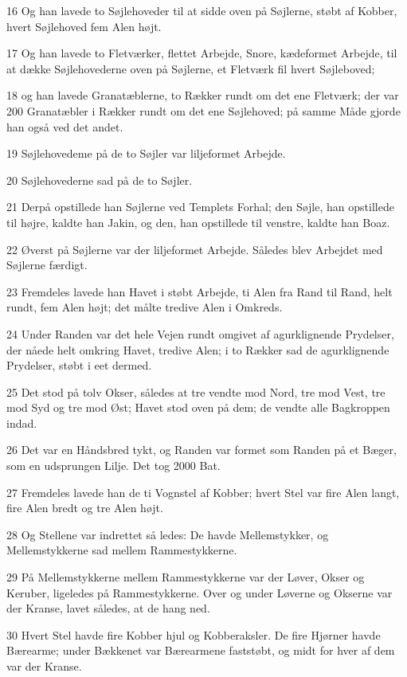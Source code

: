 \par 16 Og han lavede to Søjlehoveder til at sidde oven på Søjlerne, støbt af Kobber, hvert Søjlehoved fem Alen højt.
\par 17 Og han lavede to Fletværker, flettet Arbejde, Snore, kædeformet Arbejde, til at dække Søjlehovederne oven på Søjlerne, et Fletværk fil hvert Søjleboved;
\par 18 og han lavede Granatæblerne, to Rækker rundt om det ene Fletværk; der var 200 Granatæbler i Rækker rundt om det ene Søjlehoved; på samme Måde gjorde han også ved det andet.
\par 19 Søjlehovedeme på de to Søjler var liljeformet Arbejde.
\par 20 Søjlehovederne sad på de to Søjler.
\par 21 Derpå opstillede han Søjlerne ved Templets Forhal; den Søjle, han opstillede til højre, kaldte han Jakin, og den, han opstillede til venstre, kaldte han Boaz.
\par 22 Øverst på Søjlerne var der liljeformet Arbejde. Således blev Arbejdet med Søjlerne færdigt.
\par 23 Fremdeles lavede han Havet i støbt Arbejde, ti Alen fra Rand til Rand, helt rundt, fem Alen højt; det målte tredive Alen i Omkreds.
\par 24 Under Randen var det hele Vejen rundt omgivet af agurklignende Prydelser, der nåede helt omkring Havet, tredive Alen; i to Rækker sad de agurklignende Prydelser, støbt i eet dermed.
\par 25 Det stod på tolv Okser, således at tre vendte mod Nord, tre mod Vest, tre mod Syd og tre mod Øst; Havet stod oven på dem; de vendte alle Bagkroppen indad.
\par 26 Det var en Håndsbred tykt, og Randen var formet som Randen på et Bæger, som en udsprungen Lilje. Det tog 2000 Bat.
\par 27 Fremdeles lavede han de ti Vognstel af Kobber; hvert Stel var fire Alen langt, fire Alen bredt og tre Alen højt.
\par 28 Og Stellene var indrettet så ledes: De havde Mellemstykker, og Mellemstykkerne sad mellem Rammestykkerne.
\par 29 På Mellemstykkerne mellem Rammestykkerne var der Løver, Okser og Keruber, ligeledes på Rammestykkerne. Over og under Løverne og Okserne var der Kranse, lavet således, at de hang ned.
\par 30 Hvert Stel havde fire Kobber hjul og Kobberaksler. De fire Hjørner havde Bærearme; under Bækkenet var Bærearmene faststøbt, og midt for hver af dem var der Kranse.
